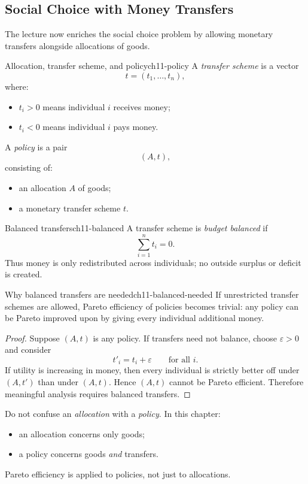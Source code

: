\subsection{Social Choice with Money Transfers}

The lecture now enriches the social choice problem by allowing monetary transfers alongside allocations of goods.

\begin{definition}{Allocation, transfer scheme, and policy}{ch11-policy}
A \emph{transfer scheme} is a vector
\[
t=(t_1,\dots,t_n),
\]
where:
\begin{itemize}
    \item $t_i>0$ means individual $i$ receives money;
    \item $t_i<0$ means individual $i$ pays money.
\end{itemize}
A \emph{policy} is a pair
\[
(A,t),
\]
consisting of:
\begin{itemize}
    \item an allocation $A$ of goods;
    \item a monetary transfer scheme $t$.
\end{itemize}
\end{definition}

\begin{definition}{Balanced transfers}{ch11-balanced}
A transfer scheme is \emph{budget balanced} if
\[
\sum_{i=1}^n t_i = 0.
\]
Thus money is only redistributed across individuals; no outside surplus or deficit is created.
\end{definition}

\begin{theorem}{Why balanced transfers are needed}{ch11-balanced-needed}
If unrestricted transfer schemes are allowed, Pareto efficiency of policies becomes trivial: any policy can be Pareto improved upon by giving every individual additional money.
\end{theorem}

\begin{proof}
Suppose $(A,t)$ is any policy. If transfers need not balance, choose $\varepsilon>0$ and consider
\[
t'_i=t_i+\varepsilon
\qquad \text{for all } i.
\]
If utility is increasing in money, then every individual is strictly better off under $(A,t')$ than under $(A,t)$. Hence $(A,t)$ cannot be Pareto efficient. Therefore meaningful analysis requires balanced transfers.
\end{proof}

\begin{commonmistake}
Do not confuse an \emph{allocation} with a \emph{policy}. In this chapter:
\begin{itemize}
    \item an allocation concerns only goods;
    \item a policy concerns goods \emph{and} transfers.
\end{itemize}
Pareto efficiency is applied to policies, not just to allocations.
\end{commonmistake}

